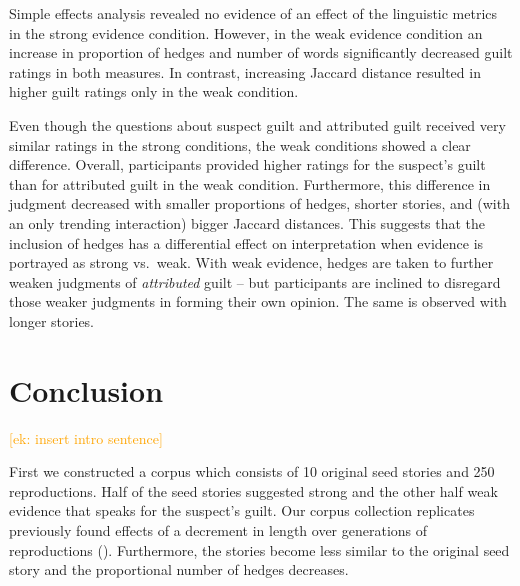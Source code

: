 \documentclass[10pt,letterpaper]{article}
\newcommand{\ek}[1]{\textcolor{Orange}{[ek: #1]}}
\newcommand{\jd}[1]{\textcolor{Green}{[jd: #1]}}
\begin{document}
Simple effects analysis revealed no evidence of an effect of the linguistic metrics in the strong evidence condition. However, in the weak evidence condition an increase in proportion of hedges and number of words significantly decreased guilt ratings in both measures. In contrast, increasing Jaccard distance resulted in higher guilt ratings only in the weak condition.

Even though the questions about suspect guilt and attributed guilt received very similar ratings in the strong conditions, the weak conditions showed a clear difference. Overall, participants provided higher ratings for the suspect's guilt than for attributed guilt in the weak condition. Furthermore, this difference in judgment decreased with smaller proportions of hedges, shorter stories, and (with an only trending interaction)  bigger Jaccard distances. This suggests that the inclusion of hedges has a differential effect on interpretation when evidence is portrayed as strong vs.~weak. With weak evidence, hedges are taken to further weaken judgments of \emph{attributed} guilt -- but participants are inclined to disregard those weaker judgments in forming their own opinion. The same is observed with longer stories.  %




\section{Conclusion}

\ek{insert intro sentence}

First we constructed a corpus which consists of 10 original seed stories and 250 reproductions. Half of the seed stories suggested strong and the other half weak evidence that speaks for the suspect's guilt. Our corpus collection replicates previously found effects of a decrement in length over generations of reproductions (\cite{Bartlett:1932}). Furthermore, the stories become less similar to the original seed story and the proportional number of hedges decreases.
\end{document}

